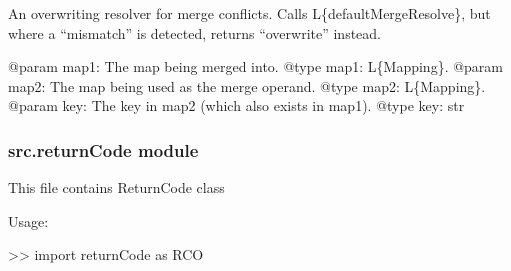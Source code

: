 \documentclass[a4paper,10pt,english]{sphinxmanual}
\begin{document}

\begin{fulllineitems}
\label{\detokenize{apidoc_src/src:src.pyconf.overwriteMergeResolve}}
An overwriting resolver for merge conflicts. Calls L\{defaultMergeResolve\},
but where a “mismatch” is detected, returns “overwrite” instead.

@param map1: The map being merged into.
@type map1: L\{Mapping\}.
@param map2: The map being used as the merge operand.
@type map2: L\{Mapping\}.
@param key: The key in map2 (which also exists in map1).
@type key: str

\end{fulllineitems}



\subsubsection{src.returnCode module}
\label{\detokenize{apidoc_src/src:module-src.returnCode}}\label{\detokenize{apidoc_src/src:src-returncode-module}}
This file contains ReturnCode class

\begin{DUlineblock}{0em}
\item[] Usage:
\item[] \textgreater{}\textgreater{} import returnCode as RCO
\end{DUlineblock}
\end{document}
